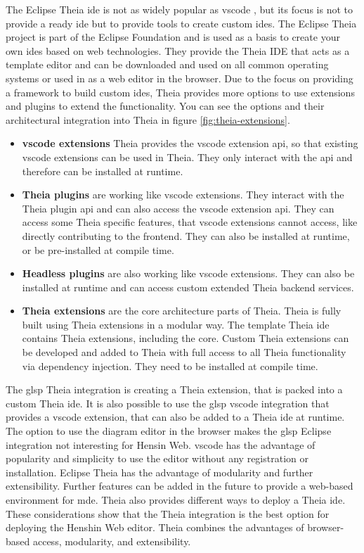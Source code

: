   The Eclipse Theia \acs{ide} is not as widely popular as \ac{vscode} \cite{stackoverflow2024survey}, but its focus is not to provide a ready \acs{ide} but to provide tools to create custom \acsp{ide}. The Eclipse Theia project is part of the Eclipse Foundation and is used as a basis to create your own \acsp{ide} based on web technologies. \cite{theia-doc} They provide the Theia IDE that acts as a template editor and can be downloaded and used on all common operating systems or used in as a web editor in the browser. Due to the focus on providing a framework to build custom \acsp{ide}, Theia provides more options to use extensions and plugins to extend the functionality. You can see the options and their architectural integration into Theia in figure \ref{fig:theia-extensions}.
  \begin{itemize}
    \item \textbf{\ac{vscode} extensions} Theia provides the \ac{vscode} extension \acs{api}, so that existing \ac{vscode} extensions can be used in Theia. They only interact with the \acs{api} and therefore can be installed at runtime.
    \item \textbf{Theia plugins} are working like \ac{vscode} extensions. They interact with the Theia plugin \acs{api} and can also access the \ac{vscode} extension \acs{api}. They can access some Theia specific features, that \ac{vscode} extensions cannot access, like directly contributing to the frontend. They can also be installed at runtime, or be pre-installed at compile time.
    \item \textbf{Headless plugins} are also working like \ac{vscode} extensions. They can also be installed at runtime and can access custom extended Theia backend services.
    \item \textbf{Theia extensions} are the core architecture parts of Theia. Theia is fully built using Theia extensions in a modular way. The template Theia \acs{ide} contains Theia extensions, including the core. Custom Theia extensions can be developed and added to Theia with full access to all Theia functionality via dependency injection. They need to be installed at compile time. \cite{theia-doc}
  \end{itemize}

  The \ac{glsp} Theia integration is creating a Theia extension, that is packed into a custom Theia \acs{ide}. It is also possible to use the \ac{glsp} \ac{vscode} integration that provides a \ac{vscode} extension, that can also be added to a Theia \acs{ide} at runtime. \cite{glsp-repo} The option to use the diagram editor in the browser makes the \ac{glsp} Eclipse integration not interesting for Hensin Web. \ac{vscode} has the advantage of popularity and simplicity to use the editor without any registration or installation. Eclipse Theia has the advantage of modularity and further extensibility. Further features can be added in the future to provide a web-based environment for \ac{mde}. Theia also provides different ways to deploy a Theia \acs{ide}.   These considerations show that the Theia integration is the best option for deploying the Henshin Web editor. Theia combines the advantages of browser-based access, modularity, and extensibility.

